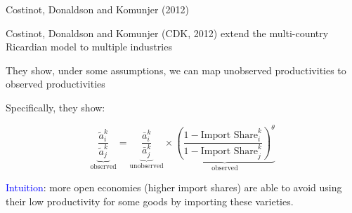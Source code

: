 \documentclass[notes,11pt, aspectratio=169, xcolor=table]{beamer}
\newcommand{\blue}[1]{\textcolor{blue}{#1}}
\newenvironment{wideitemize}{\itemize\addtolength{\itemsep}{10pt}}{\enditemize}
\begin{document}
\begin{frame}{Costinot, Donaldson and Komunjer (2012)}
\begin{wideitemize}
    \item Costinot, Donaldson and Komunjer (CDK, 2012) extend the multi-country Ricardian model to multiple industries

    \item<2-> They show, under some assumptions, we can map unobserved productivities to observed productivities

    \item<3-> Specifically, they show:

    \begin{equation*}
        \underbrace{\frac{\tilde{a}_i^k}{\tilde{a}_j^k}}_{\text{observed}} = \underbrace{\frac{\bar{a}_i^k}{\bar{a}_j^k}}_{\text{unobserved}} \times \underbrace{\left(\frac{1-\text{Import Share}_i^k}{1-\text{Import Share}_j^k}\right)^\theta}_{\text{observed}} 
    \end{equation*}

    \blue{Intuition}: more open economies (higher import shares) are able to avoid using their low productivity for some goods by importing these varieties.
    
\end{wideitemize}

\end{frame}
\end{document}
